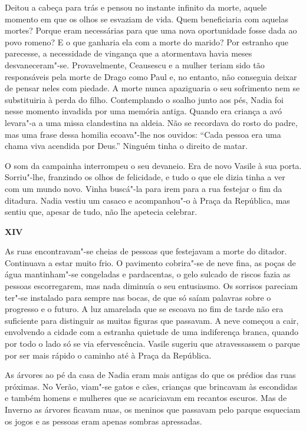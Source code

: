 Deitou a cabeça para trás e pensou no instante infinito da morte, aquele
momento em que os olhos se esvaziam de vida. Quem beneficiaria com
aquelas mortes? Porque eram necessárias para que uma nova oportunidade
fosse dada ao povo romeno? E o que ganharia ela com a morte do marido?
Por estranho que parecesse, a necessidade de vingança que a atormentava
havia meses desvaneceram"-se. Provavelmente, Ceausescu e a mulher teriam
sido tão responsáveis pela morte de Drago como Paul e, no entanto, não
conseguia deixar de pensar neles com piedade. A morte nunca apaziguaria
o seu sofrimento nem se substituiria à perda do filho. Contemplando o
soalho junto aos pés, Nadia foi nesse momento invadida por uma memória
antiga. Quando era criança a avó levara"-a a uma missa clandestina na
aldeia. Não se recordava do rosto do padre, mas uma frase dessa homilia
ecoava"-lhe nos ouvidos:
``Cada pessoa era uma chama viva acendida por Deus.''
Ninguém tinha o direito de matar.

O som da campainha interrompeu o seu devaneio. Era de novo Vasile à sua
porta. Sorriu"-lhe, franzindo os olhos de felicidade, e tudo o que ele
dizia tinha a ver com um mundo novo. Vinha buscá"-la para irem para a rua
festejar o fim da ditadura. Nadia vestiu um casaco e acompanhou"-o à
Praça da República, mas sentiu que, apesar de tudo, não lhe apetecia
celebrar.

\pagebreak
\thispagestyle{empty}
\movetooddpage
\vspace*{1.8cm}
\noindent{}\textbf{XIV}

\bigskip

As ruas encontravam"-se cheias de pessoas que festejavam a morte do
ditador. Continuava a estar muito frio. O pavimento cobrira"-se de neve
fina, as poças de água mantinham"-se congeladas e pardacentas, o gelo
sulcado de riscos fazia as pessoas escorregarem, mas nada diminuía o seu
entusiasmo. Os sorrisos pareciam ter"-se instalado para sempre nas bocas,
de que só saíam palavras sobre o progresso e o futuro. A luz amarelada
que se escoava no fim de tarde não era suficiente para distinguir as
muitas figuras que passavam. A neve começou a cair, envolvendo a cidade
com a estranha quietude de uma indiferença branca, quando por todo o
lado só se via efervescência. Vasile sugeriu que atravessassem o parque
por ser mais rápido o caminho até à Praça da República.

As árvores ao pé da casa de Nadia eram mais antigas
do que os prédios das ruas próximas. No Verão, viam"-se gatos e cães,
crianças que brincavam às escondidas e também homens e mulheres que se
acariciavam em recantos escuros. Mas de Inverno as árvores ficavam nuas,
os meninos que passavam pelo parque esqueciam os jogos e as pessoas eram apenas
sombras apressadas.


